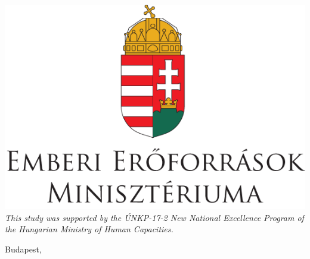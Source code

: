 \begin{titlepage}
\vfill

\begin{center}
\includegraphics[scale=0.1]{img/unkp}\\
\textit{\small{This study was supported by the \'UNKP-17-2 New National 
Excellence Program of the Hungarian Ministry of Human Capacities.}}


Budapest, \VEDESEVE
\end{center}

\end{titlepage}

